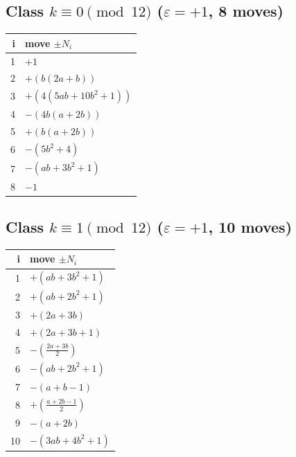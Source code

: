 \subsection*{Class $k\equiv 0\pmod{12}$ \quad ($\varepsilon=+1$, 8 moves)}
\begin{center}\renewcommand{\arraystretch}{1.35}\begin{tabular}{@{}r@{\quad}l@{}}\toprule
i & move $\pm N_i$ \\\midrule
1 & $+1$ \\
2 & $+(b \left(2 a + b\right))$ \\
3 & $+(4 \left(5 a b + 10 b^{2} + 1\right))$ \\
4 & $-(4 b \left(a + 2 b\right))$ \\
5 & $+(b \left(a + 2 b\right))$ \\
6 & $-(5 b^{2} + 4)$ \\
7 & $-(a b + 3 b^{2} + 1)$ \\
8 & $-1$ \\
\bottomrule\end{tabular}\end{center}

\subsection*{Class $k\equiv 1\pmod{12}$ \quad ($\varepsilon=+1$, 10 moves)}
\begin{center}\renewcommand{\arraystretch}{1.35}\begin{tabular}{@{}r@{\quad}l@{}}\toprule
i & move $\pm N_i$ \\\midrule
1 & $+(a b + 3 b^{2} + 1)$ \\
2 & $+(a b + 2 b^{2} + 1)$ \\
3 & $+(2 a + 3 b)$ \\
4 & $+(2 a + 3 b + 1)$ \\
5 & $-(\frac{2 a + 3 b}{2})$ \\
6 & $-(a b + 2 b^{2} + 1)$ \\
7 & $-(a + b - 1)$ \\
8 & $+(\frac{a + 2 b - 1}{2})$ \\
9 & $-(a + 2 b)$ \\
10 & $-(3 a b + 4 b^{2} + 1)$ \\
\bottomrule\end{tabular}\end{center}

